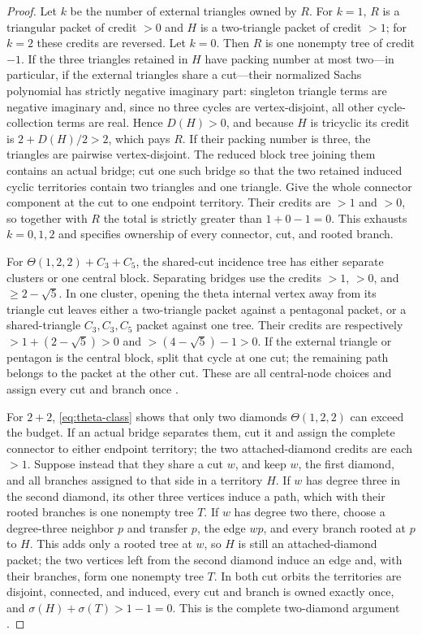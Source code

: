 \documentclass[11pt]{article}
\theoremstyle{remark}
\newcommand{\sig}{\sigma}
\begin{document}
\begin{proof}
Let $k$ be the number of external triangles owned by $R$.  For $k=1$, $R$ is
a triangular packet of credit $>0$ and $H$ is a two-triangle packet of credit
$>1$; for $k=2$ these credits are reversed.  Let $k=0$.  Then $R$ is one
nonempty tree of credit $-1$.  If the three triangles retained in $H$ have
packing number at most two---in particular, if the external triangles share a
cut---their normalized Sachs polynomial has strictly negative imaginary part:
singleton triangle terms are negative imaginary and, since no three cycles
are vertex-disjoint, all other cycle-collection terms are real.  Hence
$D(H)>0$, and because $H$ is tricyclic its credit is $2+D(H)/2>2$, which pays
$R$.  If their packing number is three, the triangles are pairwise
vertex-disjoint.  The reduced block tree joining them contains an actual
bridge; cut one such bridge so that the two retained induced cyclic territories
contain two triangles and one triangle.  Give the whole connector component at
the cut to one endpoint territory.  Their credits are $>1$ and $>0$, so
together with $R$ the total is strictly greater than $1+0-1=0$.  This exhausts
$k=0,1,2$ and specifies ownership of every connector, cut, and rooted branch.

For $\Theta(1,2,2)+C_3+C_5$, the shared-cut incidence tree
has either separate clusters or one central block.  Separating bridges use
the credits $>1$, $>0$, and $\geq2-\sqrt5$.  In one cluster, opening the
theta internal vertex away from its triangle cut leaves either a two-triangle
packet against a pentagonal packet, or a shared-triangle
$C_3,C_3,C_5$ packet against one tree.  Their credits are respectively
$>1+(2-\sqrt5)>0$ and $>(4-\sqrt5)-1>0$.  If the external triangle or
pentagon is the central block, split that cycle at one cut; the remaining path
belongs to the packet at the other cut.  These are all central-node choices
and assign every cut and branch once \cite{ThetaTwoCycles}.

For $2+2$, \eqref{eq:theta-class} shows that only two diamonds
$\Theta(1,2,2)$ can exceed the budget.  If an actual bridge separates them,
cut it and assign the complete connector to either endpoint territory; the two
attached-diamond credits are each $>1$.  Suppose instead that they share a cut
$w$, and keep $w$, the first diamond, and all branches assigned to that side
in a territory $H$.  If $w$ has degree three in the second diamond, its other
three vertices induce a path, which with their rooted branches is one nonempty
tree $T$.  If $w$ has degree two there, choose a degree-three neighbor $p$ and
transfer $p$, the edge $wp$, and every branch rooted at $p$ to $H$.  This adds
only a rooted tree at $w$, so $H$ is still an attached-diamond packet; the two
vertices left from the second diamond induce an edge and, with their branches,
form one nonempty tree $T$.  In both cut orbits the territories are disjoint,
connected, and induced, every cut and branch is owned exactly once, and
$\sig(H)+\sig(T)>1-1=0$.  This is the complete two-diamond argument
\cite{TwoDiamonds}.


\end{proof}
\end{document}
